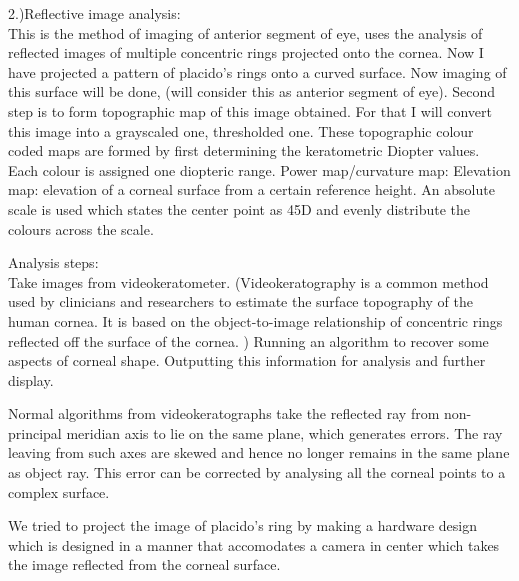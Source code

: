 \documentclass[12pt]{article}
\begin{document}
2.)Reflective image analysis:\\
  
This is the method of imaging of anterior segment of eye, uses the analysis of reflected images of multiple concentric rings projected onto the cornea.
Now I have projected a pattern of placido’s rings onto a curved surface. Now imaging of this surface will be done, (will consider this as anterior segment of eye). 
Second step is to form topographic map of this image obtained. For that I will convert this image into a grayscaled one, thresholded one. 
These topographic colour coded maps are formed by first determining the keratometric Diopter values.
Each colour is assigned one diopteric range.
Power map/curvature map:
Elevation map: elevation of  a corneal surface from a certain reference height.
An absolute scale is used which states the center point as 45D and evenly distribute the colours across the scale.

Analysis steps:\\
Take images from videokeratometer. (Videokeratography is a common method used by clinicians and researchers to estimate the surface topography of the human cornea. It is based on the object-to-image relationship of concentric rings reflected off the surface of the cornea. )
Running an algorithm to recover some aspects of corneal shape.
Outputting this information for analysis and further display. 

Normal algorithms from videokeratographs take the reflected ray from non-principal meridian axis to lie on the same plane, which generates errors. The ray leaving from such axes are skewed and hence no longer remains in the same plane as object ray.  This error can be corrected by analysing all the corneal points to a complex surface.

We tried to project the image of placido's ring by making a hardware design which is designed in a manner that accomodates a camera in center which takes the image reflected from the corneal surface.\\
\end{document}
